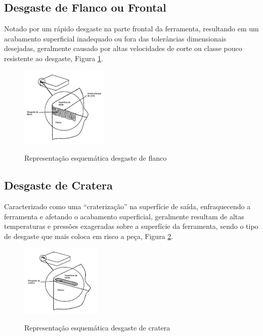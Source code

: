 \documentclass[deposito, acronym, symbols]{fei}
\begin{document}
\subsection{Desgaste de Flanco ou Frontal}

Notado por um rápido desgaste na parte frontal da ferramenta, resultando em um acabamento superficial inadequado ou fora das tolerâncias dimensionais desejadas, geralmente causado por altas velocidades de corte ou classe pouco resistente ao desgaste, Figura \ref{fig:flanco}. 

 \begin{figure}[!htb]
 \centering
    \caption{Representação esquemática desgaste de flanco}
    \includegraphics[width=0.3\linewidth]{Imagens/Exp03_Desgastedeflanco.png}
    \label{fig:flanco}
 \end{figure}

\subsection{Desgaste de Cratera}

Caracterizado como uma “craterização” na superfície de saída, enfraquecendo a ferramenta e afetando o acabamento superficial, geralmente resultam de altas temperaturas e pressões exageradas sobre a superfície da ferramenta, sendo o tipo de desgaste que mais coloca em risco a peça, Figura \ref{fig:cratera}.

 \begin{figure}[!htb]
 \centering
    \caption{Representação esquemática desgaste de cratera}
    \includegraphics[width=0.3\linewidth]{Imagens/Exp03_Desgastedecratera.png}
    \label{fig:cratera}
 \end{figure}
\end{document}
